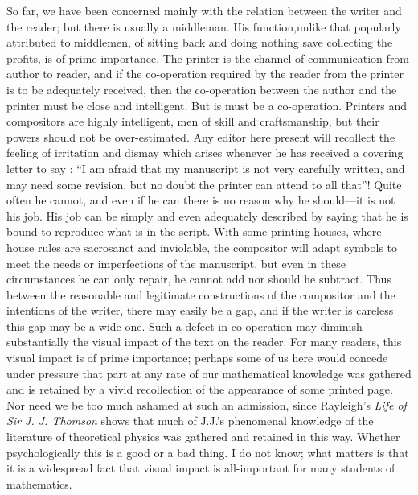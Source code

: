 So far, we have been concerned mainly with the relation between the writer and the reader; but there is usually a middleman. His function,\pageoriginale unlike that popularly attributed to middlemen, of sitting back and doing nothing save collecting the profits, is of prime importance. The printer is the channel of communication from author to reader, and if the co-operation required by the reader from the printer is to be adequately received, then the co-operation between the author and the printer must be close and intelligent. But is must be a co-operation. Printers and compositors are highly intelligent, men of skill and craftsmanship, but their powers should not be over-estimated. Any editor here present will recollect the feeling of irritation and dismay which arises whenever he has received a covering letter to say : ``I am afraid that my manuscript is not very carefully written, and may need some revision, but no doubt the printer can attend to all that''! Quite often he cannot, and even if he can there is no reason why he should---it is not his job. His job can be simply and even adequately described by saying that he is bound to reproduce what is in the script. With some printing houses, where house rules are sacrosanct and inviolable, the compositor will adapt symbols to meet the needs or imperfections of the manuscript, but even in these circumstances he can only repair, he cannot add nor should he subtract. Thus between the reasonable and legitimate constructions of the compositor and the intentions of the writer, there may easily be a gap, and if the writer is careless this gap may be a wide one. Such a defect in co-operation may diminish substantially the visual impact of the text on the reader. For many readers, this visual impact is of prime importance; perhaps some of us here would concede under pressure that part at any rate of our mathematical knowledge was gathered and is retained by a vivid recollection of the appearance of some printed page. Nor need we be too much ashamed at such an admission, since Rayleigh's {\em Life of Sir J. J. Thomson} shows that much of J.J.'s phenomenal knowledge of the literature of theoretical physics was gathered and retained in this way. Whether psychologically this is a good or a bad thing. I do not know; what matters is that it is a widespread fact that visual impact is all-important for many students of mathematics.

